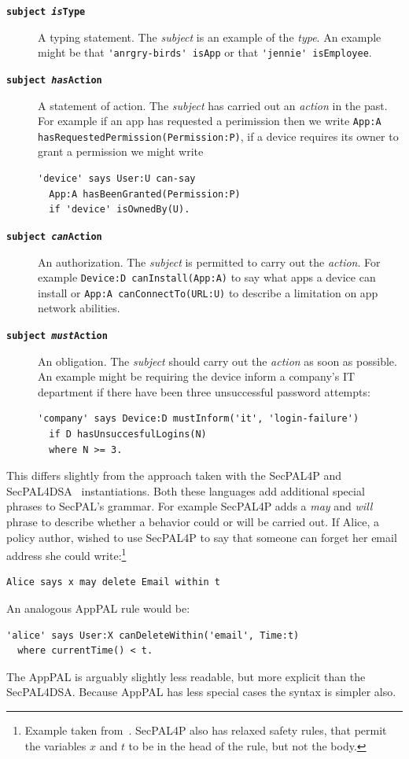 \documentclass[thesis.tex]{subfiles}
\begin{document}
\begin{description}
\item[\bfseries\texttt{subject \emph{is}Type}]
  A typing statement.  The \emph{subject} is an example of the \emph{type}.  An
  example might be that \lstinline!'anrgry-birds' isApp! or that
  \lstinline!'jennie' isEmployee!.
\item[\bfseries\texttt{subject \emph{has}Action}]
  A statement of action.  The \emph{subject} has carried out an \emph{action} in
  the past. For example if an app has requested a perimission then we write
  \lstinline!App:A hasRequestedPermission(Permission:P)!, if a device requires
  its owner to grant a permission we might write
  \begin{lstlisting}
'device' says User:U can-say 
  App:A hasBeenGranted(Permission:P)
  if 'device' isOwnedBy(U).
  \end{lstlisting}
\item[\bfseries\texttt{subject \emph{can}Action}]
  An authorization. The \emph{subject} is permitted to carry out the \emph{action}.
  For example \lstinline!Device:D canInstall(App:A)! to say what apps a device
  can install or \lstinline!App:A canConnectTo(URL:U)! to describe a limitation
  on app network abilities.
\item[\bfseries\texttt{subject \emph{must}Action}]
  An obligation.  The \emph{subject} should carry out the \emph{action} as soon
  as possible.
  An example might be requiring the device inform a company's IT department if
  there have been three unsuccessful password attempts:
  \begin{lstlisting}
'company' says Device:D mustInform('it', 'login-failure')
  if D hasUnsuccesfulLogins(N)
  where N >= 3.
  \end{lstlisting}
\end{description}

This differs slightly from the approach taken with the SecPAL4P and SecPAL4DSA~\cite{becker_framework_????,aziz_secpal4dsa:_2011} instantiations.
Both these languages add additional special phrases to SecPAL's grammar.
For example SecPAL4P adds a \emph{may} and \emph{will} phrase to describe whether a behavior could or will be carried out.
If Alice, a policy author, wished to use SecPAL4P to say that someone can forget her email address she could write:\footnote{%
  Example taken from~\cite{becker_framework_????}.  SecPAL4P also has relaxed safety rules, that permit the variables $x$ and $t$ to be in the head of the rule, but not the body.}
\begin{lstlisting}
Alice says x may delete Email within t
\end{lstlisting}
An analogous AppPAL rule would be:
\begin{lstlisting}
'alice' says User:X canDeleteWithin('email', Time:t)
  where currentTime() < t.
\end{lstlisting}
The AppPAL is arguably slightly less readable, but more explicit than the SecPAL4DSA.
Because AppPAL has less special cases the syntax is simpler also.
\end{document}
